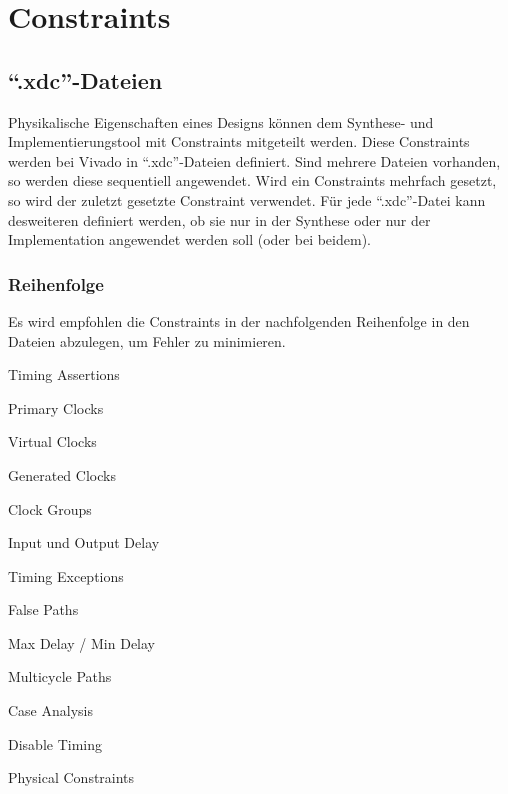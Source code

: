 \section{Constraints}
\subsection{``.xdc''-Dateien}
Physikalische Eigenschaften eines Designs können dem Synthese- und Implementierungstool mit Constraints mitgeteilt werden. Diese Constraints werden bei Vivado in ``.xdc''-Dateien definiert. Sind mehrere Dateien vorhanden, so werden diese sequentiell angewendet. Wird ein Constraints mehrfach gesetzt, so wird der zuletzt gesetzte Constraint verwendet. Für jede ``.xdc''-Datei kann desweiteren definiert werden, ob sie nur in der Synthese oder nur der Implementation angewendet werden soll (oder bei beidem).


\subsubsection{Reihenfolge}
Es wird empfohlen die Constraints in der nachfolgenden Reihenfolge in den Dateien abzulegen, um Fehler zu minimieren.
\begin{multicols}{3}
    \begin{compactenum}
        \item Timing Assertions
        \begin{compactenum}
            \item Primary Clocks
            \item Virtual Clocks
            \item Generated Clocks
            \item Clock Groups
            \item Input und Output Delay
        \end{compactenum}
        \item Timing Exceptions
        \begin{compactenum}
            \item False Paths
            \item Max Delay / Min Delay
            \item Multicycle Paths
            \item Case Analysis
            \item Disable Timing
        \end{compactenum}
        \item Physical Constraints \\ \ \\ \ \\ \ \\
    \end{compactenum}
\end{multicols}

